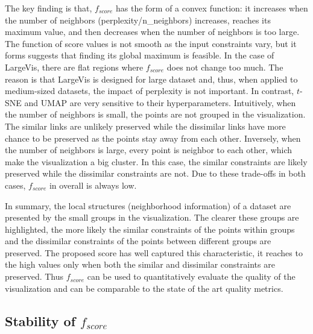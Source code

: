 The key finding is that, $f_{score}$ has the form of a convex function: it increases when the number of neighbors (perplexity/{n\_neighbors}) increases, reaches its maximum value, and then decreases when the number of neighbors is too large.
The function of score values is not smooth as the input constraints vary,
but it forms suggests that finding its global maximum is feasible.
In the case of LargeVis, there are flat regions where $f_{score}$ does not change too much.
The reason is that LargeVis is designed for large dataset and, thus, when applied to medium-sized datasets,
the impact of perplexity is not important.
In contrast, $t$-SNE and UMAP are very sensitive to their hyperparameters.
Intuitively, when the number of neighbors is small, the points are not grouped in the visualization.
The similar links are unlikely preserved while the dissimilar links have more chance to be preserved as the points stay away from each other.
Inversely, when the number of neighbors is large, every point is neighbor to each other, which make the visualization a big cluster.
In this case, the similar constraints are likely preserved while the dissimilar constraints are not.
Due to these trade-offs in both cases, $f_{score}$ in overall is always low. 

In summary, the local structures (neighborhood information) of a dataset are presented by the small groups in the visualization.
The clearer these groups are highlighted, the more likely the similar constraints of the points within groups and the dissimilar constraints of the points between different groups are preserved.
The proposed score has well captured this characteristic, it reaches to the high values only when both the similar and dissimilar constraints are preserved.
Thus $f_{score}$ can be used to quantitatively evaluate the quality of the visualization and can be comparable to the state of the art quality metrics.

\subsection{Stability of $f_{score}$}\label{sec:result:stability}

